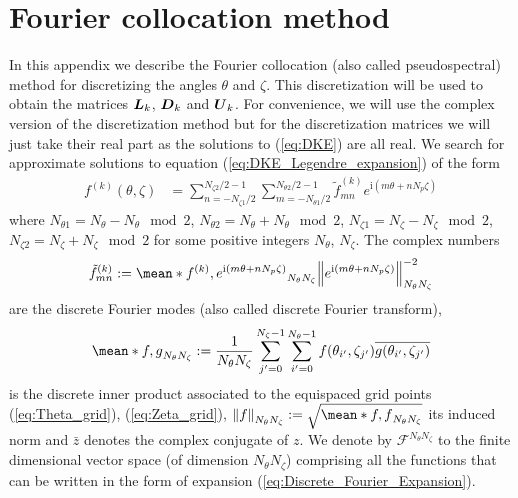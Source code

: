 \documentclass[10pt]{iopart}
\newcommand{\ii}{\text{i}}
\begin{document}
 \section{Fourier collocation method} \label{sec:Appendix_Fourier}
 
 In this appendix we describe the Fourier collocation (also called pseudospectral) method for discretizing the angles $\theta$ and $\zeta$. This discretization will be used to obtain the matrices $\vb*{L}_k$, $\vb*{D}_k$ and $\vb*{U}_k$. For convenience, we will use the complex version of the discretization method but for the discretization matrices we will just take their real part as the solutions to (\ref{eq:DKE}) are all real. We search for approximate solutions to equation (\ref{eq:DKE_Legendre_expansion}) of the form
 \begin{align}
 	f^{(k)}(\theta,\zeta) 
 	& = 
 	\sum_{n=-N_{\zeta1}/2}^{N_{\zeta2}/2-1}
 	\sum_{m=-N_{\theta1}/2}^{N_{\theta2}/2-1}
 	\tilde{f}_{mn}^{(k)}
 	e^{\ii(m\theta + nN_{p}\zeta)}
 	\label{eq:Discrete_Fourier_Expansion}
 \end{align}
 where $N_{\theta1} = N_\theta - N_\theta\mod 2 $, $N_{\theta2} = N_\theta + N_\theta\mod 2 $, $N_{\zeta1} = N_\zeta - N_\zeta\mod 2 $, $N_{\zeta2} = N_\zeta + N_\zeta\mod 2 $ for some positive integers $N_\theta$, $N_\zeta$. The complex numbers 
 \begin{align}
 	\tilde{f}_{mn}^{(k)}
 	:=
 	\mean*{f^{(k)}, e^{\ii(m\theta + nN_{p}\zeta)}}_{N_\theta N_\zeta}
 	\norm{ e^{\ii(m\theta + nN_{p}\zeta)}}_{N_\theta N_\zeta}^{-2}
 	\label{eq:Discrete_Fourier_Transform}
 \end{align}
 are the discrete Fourier modes (also called discrete Fourier transform), 
 \begin{align}
 	\mean*{f,g}_{N_\theta N_\zeta}:= 
 	\frac{1}{N_\theta N_\zeta}	
 	\sum_{j'=0}^{N_{\zeta}-1}
 	\sum_{i'=0}^{N_{\theta}-1}
 	f(\theta_{i'},\zeta_{j'})
 	\overline{g(\theta_{i'},\zeta_{j'})}
 	\label{eq:Discrete_Fourier_Inner_product}
 \end{align} 
 is the discrete inner product associated to the equispaced grid points (\ref{eq:Theta_grid}), (\ref{eq:Zeta_grid}), $\norm{ f}_{N_\theta N_\zeta}:=\sqrt{\mean*{f,f}_{N_\theta N_\zeta}}$ its induced norm and $\bar{z}$ denotes the complex conjugate of $z$. We denote by $\mathcal{F}^{N_\theta N_\zeta}$ to the finite dimensional vector space (of dimension $N_\theta N_\zeta$) comprising all the functions that can be written in the form of expansion (\ref{eq:Discrete_Fourier_Expansion}).
 
\end{document}
